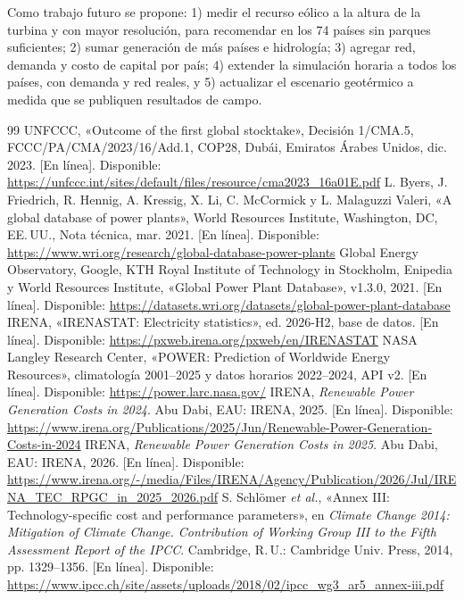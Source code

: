 \documentclass[journal,letterpaper]{IEEEtran}
\begin{document}
Como trabajo futuro se propone: 1) medir el recurso eólico a la altura de la turbina y con mayor resolución, para recomendar en los 74 países sin parques suficientes; 2) sumar generación de más países e hidrología; 3) agregar red, demanda y costo de capital por país; 4) extender la simulación horaria a todos los países, con demanda y red reales, y 5) actualizar el escenario geotérmico a medida que se publiquen resultados de campo.

\begin{thebibliography}{99}
\footnotesize\setlength{\itemsep}{0pt}
 UNFCCC, «Outcome of the first global stocktake», Decisión 1/CMA.5, FCCC/PA/CMA/2023/16/Add.1, COP28, Dubái, Emiratos Árabes Unidos, dic. 2023. [En línea]. Disponible: \url{https://unfccc.int/sites/default/files/resource/cma2023_16a01E.pdf}
 L. Byers, J. Friedrich, R. Hennig, A. Kressig, X. Li, C. McCormick y L. Malaguzzi Valeri, «A global database of power plants», World Resources Institute, Washington, DC, EE.\,UU., Nota técnica, mar. 2021. [En línea]. Disponible: \url{https://www.wri.org/research/global-database-power-plants}
 Global Energy Observatory, Google, KTH Royal Institute of Technology in Stockholm, Enipedia y World Resources Institute, «Global Power Plant Database», v1.3.0, 2021. [En línea]. Disponible: \url{https://datasets.wri.org/datasets/global-power-plant-database}
 IRENA, «IRENASTAT: Electricity statistics», ed. 2026-H2, base de datos. [En línea]. Disponible: \url{https://pxweb.irena.org/pxweb/en/IRENASTAT}
 NASA Langley Research Center, «POWER: Prediction of Worldwide Energy Resources», climatología 2001--2025 y datos horarios 2022--2024, API v2. [En línea]. Disponible: \url{https://power.larc.nasa.gov/}
 IRENA, \emph{Renewable Power Generation Costs in 2024}. Abu Dabi, EAU: IRENA, 2025. [En línea]. Disponible: \url{https://www.irena.org/Publications/2025/Jun/Renewable-Power-Generation-Costs-in-2024}
 IRENA, \emph{Renewable Power Generation Costs in 2025}. Abu Dabi, EAU: IRENA, 2026. [En línea]. Disponible: \url{https://www.irena.org/-/media/Files/IRENA/Agency/Publication/2026/Jul/IRENA_TEC_RPGC_in_2025_2026.pdf}
 S. Schlömer \emph{et al.}, «Annex III: Technology-specific cost and performance parameters», en \emph{Climate Change 2014: Mitigation of Climate Change. Contribution of Working Group III to the Fifth Assessment Report of the IPCC}. Cambridge, R.\,U.: Cambridge Univ. Press, 2014, pp. 1329--1356. [En línea]. Disponible: \url{https://www.ipcc.ch/site/assets/uploads/2018/02/ipcc_wg3_ar5_annex-iii.pdf}

\end{thebibliography}
\end{document}
